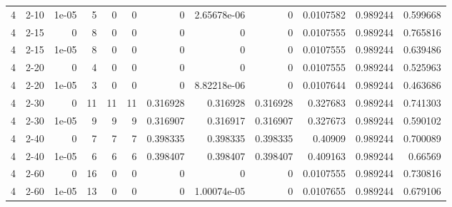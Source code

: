 \begin{tabular}{rlrrrrrrrrrr}
     4 & 2-10   &      1e-05 &           5 &                 0 &                 0 &     0           &     2.65678e-06 &      0           &        0.0107582 &               0.989244 &           0.599668 \\
     4 & 2-15   &      0     &           8 &                 0 &                 0 &     0           &     0           &      0           &        0.0107555 &               0.989244 &           0.765816 \\
     4 & 2-15   &      1e-05 &           8 &                 0 &                 0 &     0           &     0           &      0           &        0.0107555 &               0.989244 &           0.639486 \\
     4 & 2-20   &      0     &           4 &                 0 &                 0 &     0           &     0           &      0           &        0.0107555 &               0.989244 &           0.525963 \\
     4 & 2-20   &      1e-05 &           3 &                 0 &                 0 &     0           &     8.82218e-06 &      0           &        0.0107644 &               0.989244 &           0.463686 \\
     4 & 2-30   &      0     &          11 &                11 &                11 &     0.316928    &     0.316928    &      0.316928    &        0.327683  &               0.989244 &           0.741303 \\
     4 & 2-30   &      1e-05 &           9 &                 9 &                 9 &     0.316907    &     0.316917    &      0.316907    &        0.327673  &               0.989244 &           0.590102 \\
     4 & 2-40   &      0     &           7 &                 7 &                 7 &     0.398335    &     0.398335    &      0.398335    &        0.40909   &               0.989244 &           0.700089 \\
     4 & 2-40   &      1e-05 &           6 &                 6 &                 6 &     0.398407    &     0.398407    &      0.398407    &        0.409163  &               0.989244 &           0.66569  \\
     4 & 2-60   &      0     &          16 &                 0 &                 0 &     0           &     0           &      0           &        0.0107555 &               0.989244 &           0.730816 \\
     4 & 2-60   &      1e-05 &          13 &                 0 &                 0 &     0           &     1.00074e-05 &      0           &        0.0107655 &               0.989244 &           0.679106 \\

\end{tabular}
